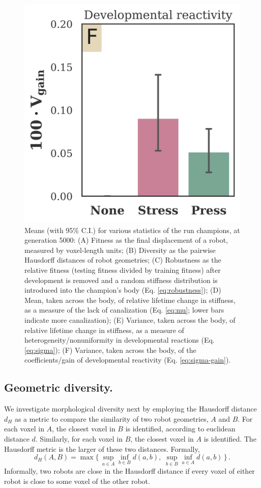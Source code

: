\begin{figure}[t]
\includegraphics[width=0.32\linewidth]{Chapter06/img/Var_devo_gain}
\caption{\label{fig:run_champs} 
Means (with 95\% C.I.) for various statistics of the run champions, at generation 5000: 
(A) Fitness as the final displacement of a robot, measured by voxel-length units; 
(B) Diversity as the pairwise Hausdorff distances of robot geometries; 
(C) Robustness as the relative fitness (testing fitness divided by training fitness) after development is removed and a random stiffness distribution is introduced
into the champion's body (Eq. \ref{eq:robustness});
(D) Mean, taken across the body, of relative lifetime change in stiffness, as a measure of the lack of canalization (Eq. \ref{eq:mu}; lower bars indicate more canalization);
(E) Variance, taken across the body, of relative lifetime change in stiffness, as a measure of heterogeneity/nonuniformity in developmental reactions (Eq. \ref{eq:sigma});
(F) Variance, taken across the body, of the coefficients/gain of developmental reactivity (Eq. \ref{eq:sigma-gain}).
}
\end{figure}


\subsection{Geometric diversity.}

We investigate morphological diversity next by
employing the Hausdorff distance $d_H$ as a metric to compare the similarity of two robot geometries, $A$ and $B$.
For each voxel in $A$, the closest voxel in $B$ is identified, according to euclidean distance $d$.
Similarly, for each voxel in $B$, the closest voxel in $A$ is identified.
The Hausdorff metric is the larger of these two distances. 
Formally,
\begin{equation}
\label{eq:hausdorff}
d_H(A,B) = \max\{\,\sup_{a \in A} \inf_{b \in B} d(a,b),\; \sup_{b \in B} \inf_{a \in A} d(a,b)\,\} \, . %
\end{equation}
Informally, two robots are close in the Hausdorff distance if every voxel of either robot is close to some voxel of the other robot. 
 

